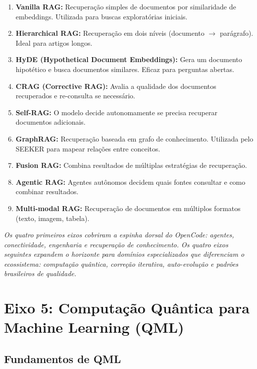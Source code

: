 \begin{enumerate}
  \item \textbf{Vanilla RAG:} Recuperação simples de documentos por similaridade de embeddings. Utilizada para buscas exploratórias iniciais.
  \item \textbf{Hierarchical RAG:} Recuperação em dois níveis (documento $\rightarrow$ parágrafo). Ideal para artigos longos.
  \item \textbf{HyDE (Hypothetical Document Embeddings):} Gera um documento hipotético e busca documentos similares. Eficaz para perguntas abertas.
  \item \textbf{CRAG (Corrective RAG):} Avalia a qualidade dos documentos recuperados e re-consulta se necessário.
  \item \textbf{Self-RAG:} O modelo decide autonomamente se precisa recuperar documentos adicionais.
  \item \textbf{GraphRAG:} Recuperação baseada em grafo de conhecimento. Utilizada pelo SEEKER para mapear relações entre conceitos.
  \item \textbf{Fusion RAG:} Combina resultados de múltiplas estratégias de recuperação.
  \item \textbf{Agentic RAG:} Agentes autônomos decidem quais fontes consultar e como combinar resultados.
  \item \textbf{Multi-modal RAG:} Recuperação de documentos em múltiplos formatos (texto, imagem, tabela).
\end{enumerate}

{\small\itshape Os quatro primeiros eixos cobriram a espinha dorsal do OpenCode: agentes, conectividade, engenharia e recuperação de conhecimento. Os quatro eixos seguintes expandem o horizonte para domínios especializados que diferenciam o ecossistema: computação quântica, correção iterativa, auto-evolução e padrões brasileiros de qualidade.}

\section{Eixo 5: Computação Quântica para Machine Learning (QML)}

\subsection{Fundamentos de QML}

